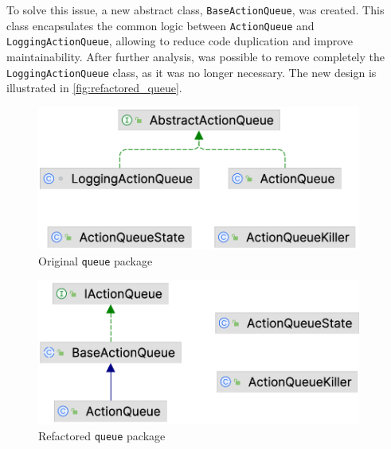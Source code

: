 To solve this issue, a new abstract class, \texttt{BaseActionQueue}, was created. This class encapsulates the common logic between \texttt{ActionQueue} and \texttt{LoggingActionQueue}, allowing to reduce code duplication and improve maintainability. After further analysis, was possible to remove completely the \texttt{LoggingActionQueue} class, as it was no longer necessary. The new design is illustrated in \autoref{fig:refactored_queue}.

\begin{minipage}{0.5\linewidth}
	\begin{figure}[H]
		\begin{center}
			\includegraphics[width=0.95\textwidth]{figures/queue_package/original.png}
			\caption{Original \texttt{queue} package}
			\label{fig:original_queue}
		\end{center}
	\end{figure}
\end{minipage}
\begin{minipage}{0.5\linewidth}
	\begin{figure}[H]
		\begin{center}
			\includegraphics[width=0.95\textwidth]{figures/queue_package/refactored.png}
			\caption{Refactored \texttt{queue} package}
			\label{fig:refactored_queue}
		\end{center}
	\end{figure}
\end{minipage}


